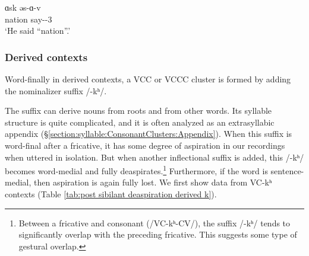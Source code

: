   \begin{exe}
  	\ex \gll  ɑsk əs-ɑ-v \\
  	nation say-{\pst}-3{\sg} \\
  	`He said ``nation''.'\\ \label{ex:phonosegm:deaspSentence}
  \end{exe}
  
  
  
  
  \subsubsection{Derived contexts}\label{section:segmentalPhono:allphonLaryng:finalDeasp:derived}
  
  Word-finally in derived contexts, a VCC or VCCC cluster is formed by adding the nominalizer suffix /-kʰ/. 
  
  
  The suffix can derive nouns from roots and from other words. Its syllable structure is quite complicated, and it is often analyzed as an extrasyllabic appendix  (\S\ref{section:syllable:ConsonantClusters:Appendix}). When this suffix is word-final after a fricative, it has some degree of aspiration in our recordings when uttered in isolation. But when another inflectional suffix is added, this /-kʰ/ becomes word-medial and fully deaspirates.\footnote{Between a fricative and consonant (/VC-kʰ-CV/), the suffix /-kʰ/ tends to significantly overlap with the preceding fricative. This suggests some type of gestural overlap. } Furthermore, if the word is sentence-medial, then aspiration is again fully lost. We first show data from VC-kʰ contexts (Table \ref{tab:post sibilant deaspiration derived k}). 
  
  
  

